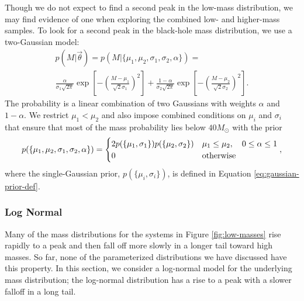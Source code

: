 \documentclass[preprint]{aastex}
\newcommand{\Msun}{M_\odot}
\newcommand{\vtheta}{\vec{\theta}}
\begin{document}
Though we do not expect to find a second peak in the low-mass
distribution, we may find evidence of one when exploring the combined
low- and higher-mass samples.  To look for a second peak in the
black-hole mass distribution, we use a two-Gaussian model:
\begin{multline}
  \label{eq:two-gaussian-def}
  p(M|\vtheta) = p(M|\{\mu_1, \mu_2, \sigma_1, \sigma_2, \alpha\}) = \\
  \frac{\alpha}{\sigma_1 \sqrt{2\pi}} \exp\left[ - \left( \frac{M -
        \mu_1}{\sqrt{2}\sigma_1} \right)^2 \right] + \frac{1-\alpha}{\sigma_2 \sqrt{2\pi}} \exp\left[ - \left( \frac{M -
        \mu_2}{\sqrt{2}\sigma_2} \right)^2 \right].
\end{multline}
The probability is a linear combination of two Gaussians with weights
$\alpha$ and $1-\alpha$.  We restrict $\mu_1 < \mu_2$ and also impose
combined conditions on $\mu_i$ and $\sigma_i$ that ensure that most of
the mass probability lies below $40 \Msun$ with the prior
\begin{equation}
  p(\{\mu_1, \mu_2, \sigma_1, \sigma_2, \alpha\}) = 
  \begin{cases}
    2 p(\{\mu_1, \sigma_1\}) p(\{\mu_2, \sigma_2\}) & \mu_1 \leq
    \mu_2, \quad 0 \leq \alpha \leq 1 \\
    0 & \textnormal{otherwise}
  \end{cases},
\end{equation}
where the single-Gaussian prior, $p(\{\mu_i, \sigma_i\})$, is defined
in Equation \eqref{eq:gaussian-prior-def}.

\subsubsection{Log Normal}
\label{sec:log-normal}

Many of the mass distributions for the systems in Figure
\ref{fig:low-masses} rise rapidly to a peak and then fall off more
slowly in a longer tail toward high masses.  So far, none of the
parameterized distributions we have discussed have this property.  In
this section, we consider a log-normal model for the underlying mass
distribution; the log-normal distribution has a rise to a peak with a
slower falloff in a long tail.  
\end{document}
